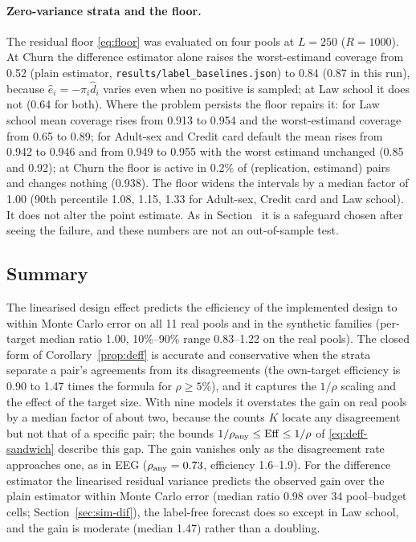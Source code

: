 \paragraph{Zero-variance strata and the floor.} The residual floor \eqref{eq:floor} was evaluated on four pools at $L=250$ ($R=1000$). At Churn the difference estimator alone raises the worst-estimand coverage from 0.52 (plain estimator, \texttt{results/label\_baselines.json}) to 0.84 (0.87 in this run), because
$\hat e_i=-\pi_i\hat d_i$ varies even when no positive is sampled; at Law school it does not (0.64 for both). Where the problem persists the floor repairs it: for Law school mean coverage rises from 0.913 to 0.954 and the worst-estimand coverage from 0.65 to 0.89; for Adult-sex and Credit card default the mean rises from 0.942 to 0.946 and from 0.949 to 0.955 with the worst estimand unchanged (0.85 and 0.92); at Churn the floor is active in 0.2\% of
(replication, estimand) pairs and changes nothing (0.938). The floor widens the intervals by a median factor of 1.00 (90th percentile 1.08, 1.15, 1.33 for Adult-sex, Credit card and Law school). It does not alter the point estimate. As in Section~ it is a safeguard chosen after seeing the failure, and these numbers are not an out-of-sample test.

\subsection{Summary}

The linearised design effect predicts the efficiency of the implemented design to within Monte
Carlo error on all 11 real pools and in the synthetic families (per-target median ratio 1.00,
10\%--90\% range 0.83--1.22 on the real pools). The closed form of Corollary~\ref{prop:deff} is
accurate and conservative when the strata separate a pair's agreements from its disagreements (the
own-target efficiency is 0.90 to 1.47 times the formula for $\rho\ge5\%$), and it captures the $1/\rho$ scaling and the effect of the
target size. With nine models it overstates the gain on real pools by a median factor of about two,
because the counts $K$ locate any disagreement but not that of a specific pair; the bounds
$1/\rho_{\rm any}\le\mathrm{Eff}\le1/\rho$ of \eqref{eq:deff-sandwich} describe this gap. The gain vanishes
only as the disagreement rate approaches one, as in EEG ($\rho_{\rm any}=0.73$, efficiency 1.6--1.9). For the difference estimator the linearised residual variance predicts the observed gain over the plain estimator within Monte Carlo error
(median ratio 0.98 over 34 pool--budget cells; Section~\ref{sec:sim-dif}), the label-free forecast does so except in Law school, and the gain is moderate (median 1.47) rather than a doubling.
